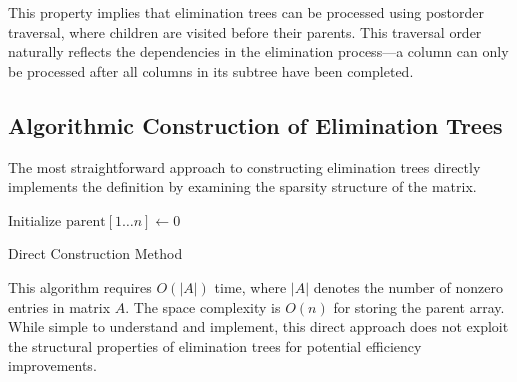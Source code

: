 This property implies that elimination trees can be processed using postorder traversal, where children are visited before their parents. This traversal order naturally reflects the dependencies in the elimination process—a column can only be processed after all columns in its subtree have been completed.

\subsection{Algorithmic Construction of Elimination Trees}

The most straightforward approach to constructing elimination trees directly implements the definition by examining the sparsity structure of the matrix.

\begin{algorithm}
\BlankLine
Initialize $\text{parent}[1 \ldots n] \leftarrow 0$ 
\caption{Direct Construction Method}
\label{alg:direct_elimination_tree}
\end{algorithm}

This algorithm requires $O(|A|)$ time, where $|A|$ denotes the number of nonzero entries in matrix $A$. The space complexity is $O(n)$ for storing the parent array. While simple to understand and implement, this direct approach does not exploit the structural properties of elimination trees for potential efficiency improvements.

